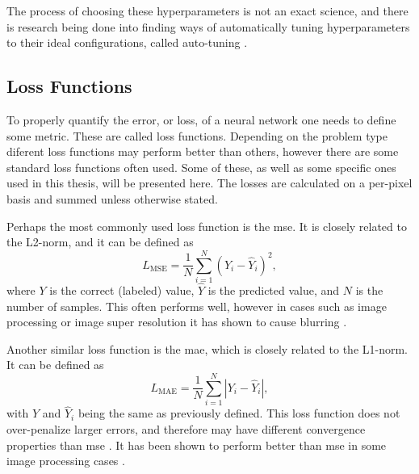 The process of choosing these hyperparameters is not an exact science, and there is research being done into finding ways of automatically tuning hyperparameters to their ideal configurations, called auto-tuning \cite{autotuning}.

\subsection{Loss Functions}
\label{sec:ml:training:lossfunctions}
To properly quantify the error, or loss, of a neural network one needs to define some metric. These are called loss functions. Depending on the problem type diferent loss functions may perform better than others, however there are some standard loss functions often used. Some of these, as well as some specific ones used in this thesis, will be presented here. The losses are calculated on a per-pixel basis and summed unless otherwise stated. 

Perhaps the most commonly used loss function is the \acrfull{mse}. It is closely related to the L2-norm, and it can be defined as
\begin{equation}
    \label{eq:lossmse}
    L_{\text{MSE}} = \frac{1}{N} \sum_{i=1}^N(Y_i - \hat{Y}_i)^2,
\end{equation}
where $Y$ is the correct (labeled) value,  $\hat{Y}$ is the predicted value, and $N$ is the number of samples. This often performs well, however in cases such as image processing or image super resolution it has shown to cause blurring \cite{7797130}.

Another similar loss function is the \acrfull{mae}, which is closely related to the L1-norm. It can be defined as
\begin{equation}
    \label{eq:lossmae}
    L_{\text{MAE}} = \frac{1}{N} \sum_{i=1}^N |Y_i - \hat{Y}_i|,
\end{equation}
with $Y$ and $\hat{Y}_i$ being the same as previously defined. This loss function does not over-penalize larger errors, and therefore may have different convergence properties than \acrshort{mse} \cite{7797130}. It has been shown to perform better than \acrshort{mse} in some image processing cases \cite{7797130,10.1002/mp.13713}. 



